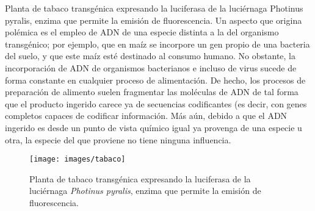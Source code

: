 \documentclass[11pt,a4paper]{article}
\begin{document}
Planta de tabaco transgénica expresando la luciferasa de la luciérnaga Photinus pyralis, enzima que permite la emisión de fluorescencia. 
Un aspecto que origina polémica es el empleo de ADN de una especie distinta a la del organismo transgénico; por ejemplo, que en maíz se incorpore un gen propio de una bacteria del suelo, y que este maíz esté destinado al consumo humano. No obstante, la incorporación de ADN de organismos bacterianos e incluso de virus sucede de forma constante en cualquier proceso de alimentación. De hecho, los procesos de preparación de alimento suelen fragmentar las moléculas de ADN de tal forma que el producto ingerido carece ya de secuencias codificantes (es decir, con genes completos capaces de codificar información.
Más aún, debido a que el ADN ingerido es desde un punto de vista químico igual ya provenga de una especie u otra, la especie del que proviene no tiene ninguna influencia. 


%
%

\begin{figure}[h]
\centering    %
\parbox{8cm}{
\centering    %
\hypertarget{target.tabaco}{\texttt{[image: images/tabaco]}}
\caption[Tabaco transgénico]{Planta de tabaco transgénica expresando la luciferasa de la luciérnaga \textit{Photinus pyralis}, enzima que permite la emisión de fluorescencia.}
\label{tabaco}
}
\end{figure}
\end{document}

